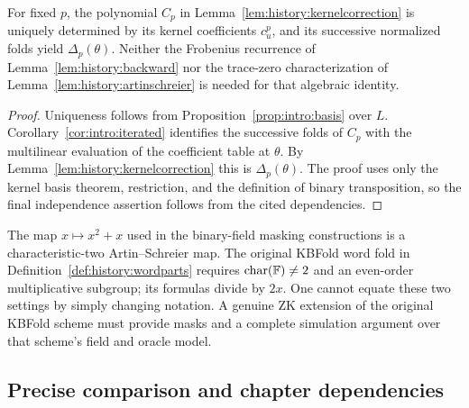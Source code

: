 \begin{proposition}\label{prop:history:structural}
For fixed $p$, the polynomial $C_p$ in Lemma~\ref{lem:history:kernelcorrection} is uniquely determined by its kernel coefficients $c_u^p$, and its successive normalized folds yield $\Delta_p(\theta)$. Neither the Frobenius recurrence of Lemma~\ref{lem:history:backward} nor the trace-zero characterization of Lemma~\ref{lem:history:artinschreier} is needed for that algebraic identity.
\end{proposition}
\begin{proof}
Uniqueness follows from Proposition~\ref{prop:intro:basis} over $L$. Corollary~\ref{cor:intro:iterated} identifies the successive folds of $C_p$ with the multilinear evaluation of the coefficient table at $\theta$. By Lemma~\ref{lem:history:kernelcorrection} this is $\Delta_p(\theta)$. The proof uses only the kernel basis theorem, restriction, and the definition of binary transposition, so the final independence assertion follows from the cited dependencies.
\end{proof}

\begin{remark}\label{rem:history:characteristic}
The map $x\mapsto x^2+x$ used in the binary-field masking constructions is a characteristic-two Artin--Schreier map. The original KBFold word fold in Definition~\ref{def:history:wordparts} requires $\operatorname{char}(\mathbb{F})\neq2$ and an even-order multiplicative subgroup; its formulas divide by $2x$. One cannot equate these two settings by simply changing notation. A genuine ZK extension of the original KBFold scheme must provide masks and a complete simulation argument over that scheme's field and oracle model.
\end{remark}

\subsection{Precise comparison and chapter dependencies}\label{sec:history:comparison}

